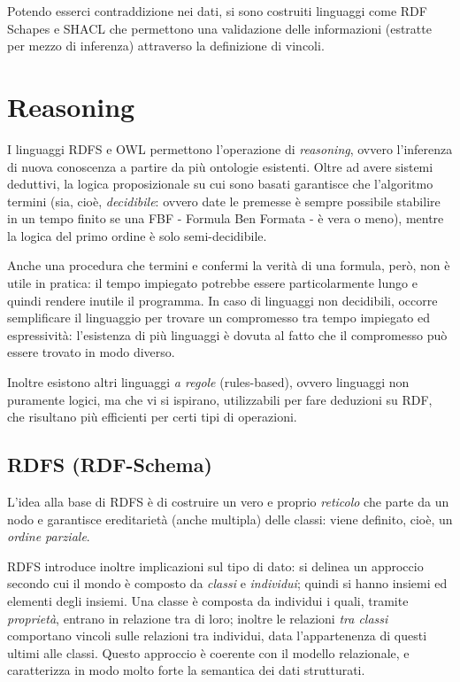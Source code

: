 \documentclass[11pt]{article}
\begin{document}
Potendo esserci contraddizione nei dati, si sono costruiti linguaggi come RDF Schapes e SHACL che permettono una validazione delle informazioni (estratte per mezzo di inferenza) attraverso la definizione di vincoli.

\section{Reasoning}
I linguaggi RDFS e OWL permettono l'operazione di \textit{reasoning}, ovvero l'inferenza di nuova conoscenza a partire da più ontologie esistenti.
Oltre ad avere sistemi deduttivi, la logica proposizionale su cui sono basati garantisce che l'algoritmo termini (sia, cioè, \textit{decidibile}: ovvero date le premesse è sempre possibile stabilire in un tempo finito se una FBF - Formula Ben Formata - è vera o meno), mentre la logica del primo ordine è solo semi-decidibile.

Anche una procedura che termini e confermi la verità di una formula, però, non è utile in pratica: il tempo impiegato potrebbe essere particolarmente lungo e quindi rendere inutile il programma.
In caso di linguaggi non decidibili, occorre semplificare il linguaggio per trovare un compromesso tra tempo impiegato ed espressività: l'esistenza di più linguaggi è dovuta al fatto che il compromesso può essere trovato in modo diverso.

Inoltre esistono altri linguaggi \textit{a regole} (rules-based), ovvero linguaggi non puramente logici, ma che vi si ispirano, utilizzabili per fare deduzioni su RDF, che risultano più efficienti per certi tipi di operazioni.

\subsection{RDFS (RDF-Schema)}
L'idea alla base di RDFS è di costruire un vero e proprio \textit{reticolo} che parte da un nodo e garantisce ereditarietà (anche multipla) delle classi: viene definito, cioè, un \textit{ordine parziale}.

RDFS introduce inoltre implicazioni sul tipo di dato: si delinea un approccio secondo cui il mondo è composto da \textit{classi} e \textit{individui}; quindi si hanno insiemi ed elementi degli insiemi.
Una classe è composta da individui i quali, tramite \textit{proprietà}, entrano in relazione tra di loro; inoltre le relazioni \textit{tra classi} comportano vincoli sulle relazioni tra individui, data l'appartenenza di questi ultimi alle classi.
Questo approccio è coerente con il modello relazionale, e caratterizza in modo molto forte la semantica dei dati strutturati.
\end{document}
